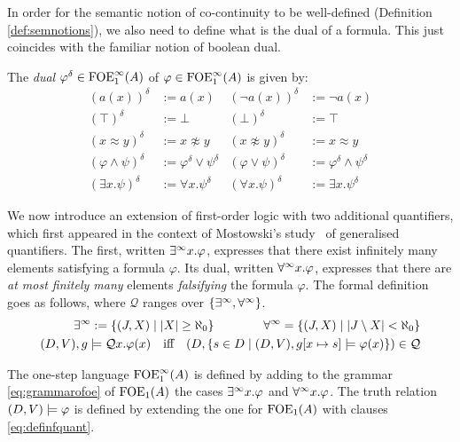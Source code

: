 In order for the semantic notion of co-continuity to be well-defined (Definition \ref{def:semnotions}), we also need to define what is the dual of a formula. This just coincides with the familiar notion of boolean dual.
\begin{definition}\label{def:concreteduals} 
The \emph{dual} $\varphi^{\delta} \in {\ensuremath{\mathrm{FOE}^{\infty}_1}}(A)$ of $\varphi\in {\ensuremath{\mathrm{FOE}^{\infty}_1}}(A)$ is given by:
\begin{align*}
 (a(x))^{\delta} & :=  a(x) 
 & (\lnot a(x))^{\delta} & :=  \lnot a(x) 
\\ (\top)^{\delta} & :=  \bot 
  & (\bot)^{\delta} & :=  \top 
\\  (x \approx y)^{\delta} & :=  x \not\approx y 
  & (x \not\approx y)^{\delta}& :=  x \approx y 
\\ (\varphi \wedge \psi)^{\delta} &:=  \varphi^{\delta} \vee \psi^{\delta} 
  &(\varphi \vee \psi)^{\delta}& :=  \varphi^{\delta} \wedge \psi^{\delta}
\\ (\exists x.\psi)^{\delta} &:=  \forall x.\psi^{\delta} 
  &(\forall x.\psi)^{\delta} &:=  \exists x.\psi^{\delta} 
\end{align*}
\end{definition}

We now introduce an extension of first-order logic with two additional quantifiers, which first appeared in the context of Mostowski's study~\cite{Mostowski1957} of generalised quantifiers. The first, written $\exists^\infty x. \varphi$, expresses that there exist infinitely many elements satisfying a formula $\varphi$. Its dual, written $\forall^\infty x. \varphi$, expresses that there are \emph{at most finitely many} elements \emph{falsifying} the formula $\varphi$. The formal definition goes as follows, where $\mathcal Q$ ranges over $\{\exists^\infty, \forall^\infty\}$.
\begin{equation}\label{eq:definfquant}
\begin{aligned}
\qu := \{(J,X) \mid |X| \geq \aleph_0\} \qquad \qquad \dqu =\{(J,X) \mid |J\setminus X| < \aleph_0\} \\
(D,V),\ass \models {\mathcal Q}x. \phi(x) \quad\text{iff}\quad (D , \{s\in D \mid (D, \val),\ass[x\mapsto s] \models \phi(x) \}) \in {\mathcal Q}
\end{aligned}
\end{equation}

\begin{definition}
The one-step language $\mathrm{FOE}^{\infty}_1(A)$ is defined by adding to the grammar \eqref{eq:grammarofoe} of $\mathrm{FOE}_1(A)$ the cases $\exists^\infty x. \varphi$ and $\forall^\infty x. \varphi$. The truth relation $(D, V) \models \varphi$ is defined by extending the one for $\mathrm{FOE}_1(A)$ with clauses \eqref{eq:definfquant}.
\end{definition}

